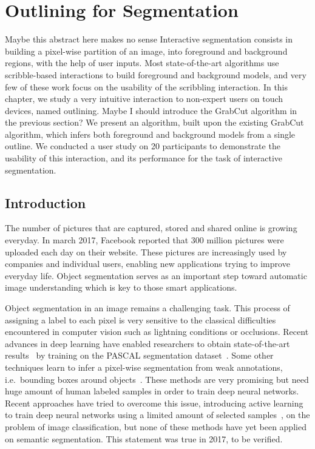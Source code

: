 \chapter{Outlining for Segmentation}%
\label{cha:contribution_outlining}

\minitoc%

\newpage%

\alert{Maybe this abstract here makes no sense}
Interactive segmentation consists in building a pixel-wise partition
of an image, into foreground and background regions,
with the help of user inputs.
Most state-of-the-art algorithms use scribble-based interactions
to build foreground and background models,
and very few of these work focus on the usability of
the scribbling interaction.
In this chapter, we study a very intuitive interaction
to non-expert users on touch devices, named outlining.
\alert{Maybe I should introduce the GrabCut algorithm in the previous section?}
We present an algorithm, built upon the existing GrabCut algorithm,
which infers both foreground and background models from a single outline.
We conducted a user study on 20 participants
to demonstrate the usability of this interaction,
and its performance for the task of interactive segmentation.


\section{Introduction}


The number of pictures that are captured,
stored and shared online is growing everyday.
In march 2017, Facebook reported that 300 million pictures
were uploaded each day on their website.
These pictures are increasingly used by companies
and individual users, enabling new applications
trying to improve everyday life.
Object segmentation serves as an important step
toward automatic image understanding which is key
to those smart applications.


Object segmentation in an image remains a challenging task.
This process of assigning a label to each pixel is very sensitive
to the classical difficulties encountered in computer vision
such as lightning conditions or occlusions.
Recent advances in deep learning have enabled researchers to obtain
state-of-the-art results~\cite{long2015fully} by training
on the PASCAL segmentation dataset~\cite{everingham2010pascal}.
Some other techniques learn to infer a pixel-wise segmentation
from weak annotations, i.e.\ bounding boxes around
objects~\cite{papandreou2015weakly}.
These methods are very promising but need huge amount of human labeled
samples in order to train deep neural networks.
Recent approaches have tried to overcome this issue,
introducing active learning to train deep neural networks
using a limited amount of selected samples~\cite{liu2017active},
on the problem of image classification, but none of these methods
have yet been applied on semantic segmentation.
\alert{This statement was true in 2017, to be verified.}


